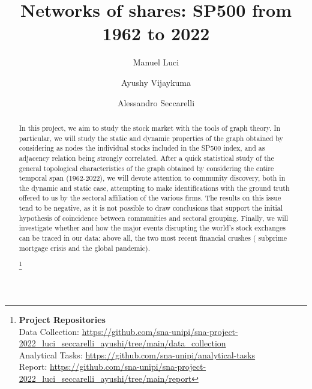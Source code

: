 \documentclass[sigchi]{acmart}
\begin{document}
%
\title{Networks of shares: SP500 from 1962 to 2022}

%
\author{Manuel Luci}

\author{Ayushy Vijaykuma }

\author{Alessandro Seccarelli}




\renewcommand{\shortauthors}{One and Two, et al.}


\begin{abstract}
In this project, we aim to study the stock market with the tools of graph theory. 
In particular, we will study the static and dynamic properties of the graph obtained by considering as nodes the individual stocks included in the SP500 index, and as adjacency relation being strongly correlated. 
After a quick statistical study of the general topological characteristics of the graph obtained by considering the entire temporal span (1962-2022), we will devote attention to community discovery, both in the dynamic and static case, attempting to make identifications with the ground truth offered to us by the sectoral affiliation of the various firms. 
The results on this issue tend to be negative, as it is not possible to draw conclusions that support the initial hypothesis of coincidence between communities and sectoral grouping.
Finally, we will investigate whether and how the major events disrupting the world's stock exchanges can be traced in our data: above all, the two most recent financial crushes ( subprime mortgage crisis and the global pandemic).

\footnote{
{\bf Project Repositories}\\
\noindent Data Collection: \url{https://github.com/sna-unipi/sna-project-2022_luci_seccarelli_ayushi/tree/main/data_collection}\\
\noindent Analytical Tasks: \url{https://github.com/sna-unipi/analytical-tasks}\\
\noindent Report: \url{https://github.com/sna-unipi/sna-project-2022_luci_seccarelli_ayushi/tree/main/report}}
\end{abstract}
\end{document}
